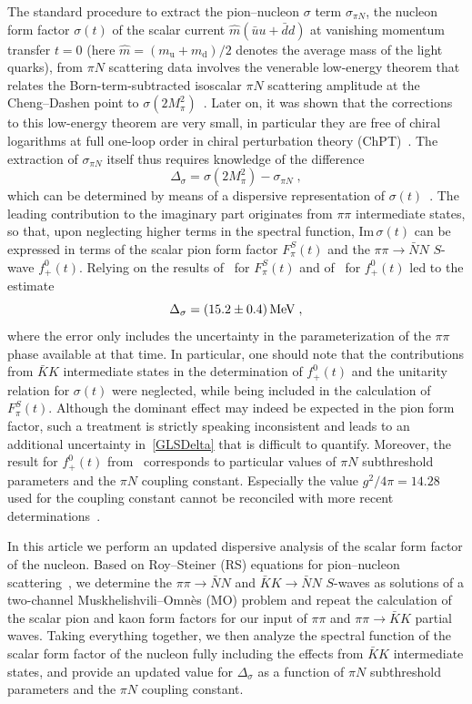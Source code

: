 \documentclass[11pt]{article}%
\providecommand{\ec}{\;,}
\newcommand{\mpi}{M_{\pi}}
\newcommand{\muu}{m_\text{u}}
\newcommand{\md}{m_\text{d}}
\newcommand{\beq}{\begin{equation}}
\newcommand{\eeq}{\end{equation}}
\renewcommand{\Im}{\text{Im}\,}
\begin{document}
The standard procedure to extract the pion--nucleon $\sigma$ term $\sigma_{\pi N}$, the nucleon form factor $\sigma(t)$ of the scalar current
$\hat m(\bar u u+\bar d d)$
at vanishing momentum transfer $t=0$ (here $\hat m=(\muu+\md)/2$ denotes the average mass of the light quarks), from $\pi N$ scattering data involves the venerable low-energy theorem that relates the Born-term-subtracted isoscalar $\pi N$ scattering amplitude at the Cheng--Dashen point to $\sigma(2\mpi^2)$~\cite{ChengDashen,BPP}. Later on, it was shown that the corrections to this low-energy theorem are very small, in particular they are free of chiral logarithms at full one-loop order in chiral perturbation theory (ChPT)~\cite{BKM96,BL01}. The extraction of $\sigma_{\pi N}$ itself thus requires knowledge of the difference
\beq
\label{Delta_sigma_def}
\Delta_\sigma=\sigma(2\mpi^2)-\sigma_{\pi N}\ec
\eeq
which can be determined by means of a dispersive representation of $\sigma(t)$~\cite{GLS90_FF}. The leading contribution to the imaginary part originates from $\pi\pi$ intermediate states, so that, upon neglecting higher terms in the spectral function, $\Im\sigma(t)$ can be expressed in terms of the scalar pion form factor $F_\pi^S(t)$ and the $\pi\pi\to\bar N N$ $S$-wave $f^0_+(t)$. Relying on the results of~\cite{DGL90} for $F_\pi^S(t)$ and of~\cite{Hoehler} for $f^0_+(t)$ led to the estimate~\cite{GLS90_FF} 
\beq
\label{GLSDelta}
\Delta_\sigma=(15.2\pm 0.4)\,{\rm MeV}\ec
\eeq
where the error only includes the uncertainty in the parameterization of the $\pi\pi$ phase available at that time. In particular, one should note that the contributions from $\bar K K$ intermediate states in the determination of $f^0_+(t)$ and the unitarity relation for $\sigma(t)$ were neglected, while being included in the calculation of $F_\pi^S(t)$. Although the dominant effect may indeed be expected in the pion form factor, such a treatment is strictly speaking inconsistent and leads to an additional uncertainty in~\eqref{GLSDelta} that is difficult to quantify. Moreover, the result for $f^0_+(t)$ from~\cite{Hoehler} corresponds to particular values of $\pi N$ subthreshold parameters and the $\pi N$ coupling constant. Especially the value $g^2/4\pi=14.28$ used for the coupling constant cannot be reconciled with more recent determinations~\cite{Nijmegen:1997,GWU:2006,piNcoupling:short,piNcoupling:long}.

In this article we perform an updated dispersive analysis of the scalar form factor of the nucleon. Based on Roy--Steiner (RS) equations for pion--nucleon scattering~\cite{RS_DHKM}, we determine the $\pi\pi\to\bar N N$ and $\bar K K\to\bar N N$ $S$-waves as solutions of a two-channel Muskhelishvili--Omn\`es (MO) problem and repeat the calculation of the scalar pion and kaon form factors for our input of $\pi\pi$ and $\pi\pi\to\bar K K$ partial waves. Taking everything together, we then analyze the spectral function of the scalar form factor of the nucleon fully including the effects from $\bar K K$ intermediate states, and provide an updated value for $\Delta_\sigma$ as a function of $\pi N$ subthreshold parameters and the $\pi N$ coupling constant.  
\end{document}
